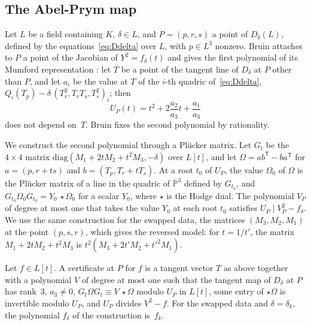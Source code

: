 \documentclass[11pt]{amsart}
\theoremstyle{definition}
\numberwithin{equation}{section}
\begin{document}
\subsection{The Abel-Prym map}
Let $L$ be a field containing $K$, $\delta\in L$, and $P=(p,r,s)$ a point of $D_\delta(L)$, defined by the equations~\eqref{eq:Ddelta} over $L$, with $p\in L^3$ nonzero. Bruin \cite[Lemma~6.1 and Proposition~6.2]{Bruin08} attaches to $P$ a point of the Jacobian of $Y^2=f_\delta(t)$ and gives the first polynomial of its Mumford representation \cite[Lemma~6.1(iii)]{Bruin08}: let $T$ be a point of the tangent line of $D_\delta$ at $P$ other than $P$, and let $a_i$ be the value at $T$ of the $i$-th quadric of~\eqref{eq:Ddelta}, $Q_i(T_p)-\delta\,(T_r^2,T_rT_s,T_s^2)_i$; then
\[
U_P(t)=t^2+2\frac{a_2}{a_3}t+\frac{a_1}{a_3}
\]
does not depend on~$T$. Bruin fixes the second polynomial by rationality.

We construct the second polynomial through a Pl\"ucker matrix. Let $G_t$ be the $4\times4$ matrix $\mathrm{diag}(M_1+2tM_2+t^2M_3,-\delta)$ over $L[t]$, and let $\Omega=ab^{\mathsf T}-ba^{\mathsf T}$ for $a=(p,r+ts)$ and $b=(T_p,T_r+tT_s)$. At a root $t_0$ of $U_P$, the value $\Omega_0$ of $\Omega$ is the Pl\"ucker matrix of a line in the quadric of $\mathbb P^3$ defined by $G_{t_0}$, and $G_{t_0}\Omega_0G_{t_0}=Y_0\,{\star}\Omega_0$ for a scalar $Y_0$, where ${\star}$ is the Hodge dual. The polynomial $V_P$ of degree at most one that takes the value $Y_0$ at each root $t_0$ satisfies $U_P\mid V_P^2-f_\delta$. We use the same construction for the swapped data, the matrices $(M_3,M_2,M_1)$ at the point $(p,s,r)$, which gives the reversed model: for $t=1/t'$, the matrix $M_1+2tM_2+t^2M_3$ is $t^2(M_3+2t'M_2+t'^2M_1)$.

Let $f\in L[t]$. A certificate at $P$ for $f$ is a tangent vector $T$ as above together with a polynomial $V$ of degree at most one such that the tangent map of $D_\delta$ at $P$ has rank~$3$, $a_3\neq0$, $G_t\Omega G_t\equiv V\,{\star}\Omega$ modulo $U_P$ in $L[t]$, some entry of ${\star}\Omega$ is invertible modulo $U_P$, and $U_P$ divides $V^2-f$. For the swapped data and $\delta=\delta_k$, the polynomial $f_{\delta}$ of the construction is~$f_k$.
\end{document}
